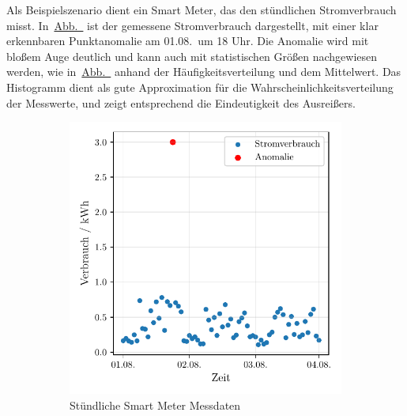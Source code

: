 Als Beispielszenario dient ein Smart Meter, das den stündlichen Stromverbrauch misst.
In~\hyperref[subfig:smartmeter]{Abb.~} ist der gemessene Stromverbrauch dargestellt, mit einer klar
erkennbaren Punktanomalie am 01.08.~um 18 Uhr. Die Anomalie wird mit bloßem Auge deutlich und kann auch mit statistischen Größen
nachgewiesen werden, wie in~\hyperref[subfig:smartmeter_histogramm]{Abb.~} anhand der
Häufigkeitsverteilung und dem Mittelwert. Das Histogramm dient als gute Approximation für die
Wahrscheinlichkeitsverteilung der Messwerte, und zeigt entsprechend die Eindeutigkeit des Ausreißers.

\begin{figure}[!t]
    \centering
    \begin{subfigure}[b]{0.49\linewidth}
        \includegraphics[width=\linewidth]{ch4_anomalien/abbildungen/punktanomalie_bsp.pdf}
        \caption{Stündliche Smart Meter Messdaten}\label{subfig:smartmeter}
    \end{subfigure}
    \begin{subfigure}[b]{0.49\linewidth}

\end{subfigure}
\end{figure}

